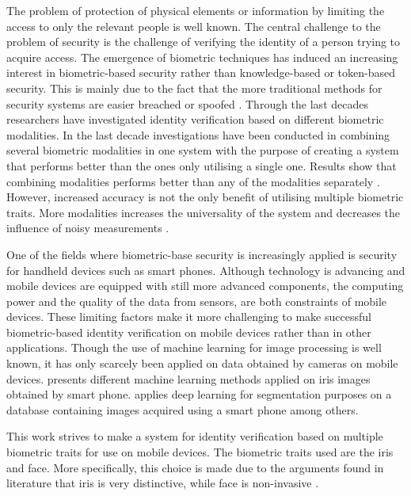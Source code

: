 The problem of protection of physical elements or information by limiting the access to only the relevant people is well known. The central challenge to the problem of security is the challenge of verifying the identity of a person trying to acquire access. The emergence of biometric techniques has induced an increasing interest in biometric-based security rather than knowledge-based or token-based security. This is mainly due to the fact  that the more traditional methods for security systems are easier breached or spoofed \citep{Ross2003}. Through the last decades researchers have investigated identity verification based on different biometric modalities. In the last decade investigations have been conducted in combining several biometric modalities in one system with the purpose of creating a system that performs better than the ones only utilising a single one. Results show that combining modalities performs better than any of the modalities separately \citep{Chen2005a}.  However, increased accuracy is not the only benefit of utilising multiple biometric traits. More modalities increases the universality of the system and decreases the influence of noisy measurements \citep{Ross2003}.

One of the fields where biometric-base security is increasingly applied is security for handheld devices such as smart phones. Although technology is advancing and mobile devices are equipped with still more advanced components, the computing power and the quality of the data from sensors, are both constraints of mobile devices. These limiting factors make it more challenging to make successful biometric-based identity verification on mobile devices rather than in other applications.  Though the use of machine learning for image processing is well known, it has only scarcely been applied on data obtained by cameras on mobile devices. \cite{Khan2017a} presents different machine learning methods applied on iris images obtained by smart phone. \cite{Bazrafkan2017} applies deep learning for segmentation purposes on a database containing images acquired using a smart phone among others. 
 
This work strives to make a system for identity verification based on multiple biometric traits for use on mobile devices. The biometric traits used are the iris and face. More specifically, this choice is made due to the arguments found in literature that iris is very distinctive, while face is non-invasive \citep{Wang2009a}. 